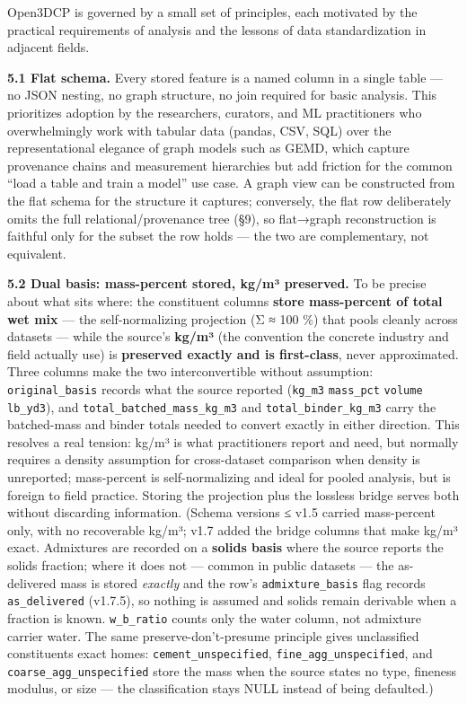 \documentclass[
  11pt,
  letterpaper,
]{article}
\begin{document}
Open3DCP is governed by a small set of principles, each motivated by the
practical requirements of analysis and the lessons of data
standardization in adjacent fields.

\textbf{5.1 Flat schema.} Every stored feature is a named column in a
single table --- no JSON nesting, no graph structure, no join required
for basic analysis. This prioritizes adoption by the researchers,
curators, and ML practitioners who overwhelmingly work with tabular data
(pandas, CSV, SQL) over the representational elegance of graph models
such as GEMD, which capture provenance chains and measurement
hierarchies but add friction for the common ``load a table and train a
model'' use case. A graph view can be constructed from the flat schema
for the structure it captures; conversely, the flat row deliberately
omits the full relational/provenance tree (§9), so flat→graph
reconstruction is faithful only for the subset the row holds --- the two
are complementary, not equivalent.

\textbf{5.2 Dual basis: mass-percent stored, kg/m³ preserved.} To be
precise about what sits where: the constituent columns \textbf{store
mass-percent of total wet mix} --- the self-normalizing projection (Σ ≈
100 \%) that pools cleanly across datasets --- while the source's
\textbf{kg/m³} (the convention the concrete industry and field actually
use) is \textbf{preserved exactly and is first-class}, never
approximated. Three columns make the two interconvertible without
assumption: \texttt{original\_basis} records what the source reported
(\texttt{kg\_m3} \textbar{} \texttt{mass\_pct} \textbar{}
\texttt{volume} \textbar{} \texttt{lb\_yd3}), and
\texttt{total\_batched\_mass\_kg\_m3} and \texttt{total\_binder\_kg\_m3}
carry the batched-mass and binder totals needed to convert exactly in
either direction. This resolves a real tension: kg/m³ is what
practitioners report and need, but normally requires a density
assumption for cross-dataset comparison when density is unreported;
mass-percent is self-normalizing and ideal for pooled analysis, but is
foreign to field practice. Storing the projection plus the lossless
bridge serves both without discarding information. (Schema versions ≤
v1.5 carried mass-percent only, with no recoverable kg/m³; v1.7 added
the bridge columns that make kg/m³ exact. Admixtures are recorded on a
\textbf{solids basis} where the source reports the solids fraction;
where it does not --- common in public datasets --- the as-delivered
mass is stored \emph{exactly} and the row's \texttt{admixture\_basis}
flag records \texttt{as\_delivered} (v1.7.5), so nothing is assumed and
solids remain derivable when a fraction is known. \texttt{w\_b\_ratio}
counts only the water column, not admixture carrier water. The same
preserve-don't-presume principle gives unclassified constituents exact
homes: \texttt{cement\_unspecified}, \texttt{fine\_agg\_unspecified},
and \texttt{coarse\_agg\_unspecified} store the mass when the source
states no type, fineness modulus, or size --- the classification stays
NULL instead of being defaulted.)
\end{document}
